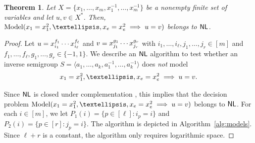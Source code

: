 \documentclass{amsart}
\newcommand{\Model}{\mathrm{Model}}
\newcommand{\eq}{\ensuremath\mathrel{=}}
\newcommand{\NL}{\ensuremath\mathsf{NL}}
\newtheorem{theorem}{Theorem}[section]
\theoremstyle{remark}
\numberwithin{equation}{section}
\begin{document}
\begin{theorem}
  Let $X = \{x_1, \dots, x_m,x_1^{-1},\dots,x_m^{-1}\}$ be a nonempty finite set of variables and let $u, v \in X^*$. Then, $\Model(x_1 \eq x_1^2,\dots,x_e \eq x_e^2 \implies u \eq v)$ belongs to $\NL$.
  \label{thm:model}
\end{theorem}
%
\begin{proof}
  Let $u \eq x_{i_1}^{f_1} \cdots x_{i_\ell}^{f_\ell}$ and $v \eq x_{j_1}^{g_1} \cdots x_{j_r}^{g_r}$ with $i_1,\dots,i_\ell,j_1,\dots,j_r \in [m]$ and $f_1,\dots,f_\ell,g_1,\dots,g_r \in \{-1,1\}$. We describe an $\NL$ algorithm to test whether an inverse semigroup $S = \langle a_1, \dots, a_k,a_1^{-1},\dots,a_k^{-1} \rangle$ does \emph{not} model
  \begin{align*}
    x_1 \eq x_1^2,\dots,x_e \eq x_e^2 \implies u \eq v.
  \end{align*}
  
  Since $\NL$ is closed under complementation \cite[Thm 8.27]{SIP:ITC}, this implies that the decision problem $\Model(x_1 \eq x_1^2,\dots,x_e \eq x_e^2 \implies u \eq v)$ belongs to $\NL$.
  For each $i \in [m]$, we let $P_1(i) = \{p \in [\ell]:i_p = i\}$ and $P_2(i) = \{p \in [r]:j_p = i\}$.
  The algorithm is depicted in Algorithm~\ref{alg:models}.
  Since $\ell + r$ is a constant, the algorithm only requires logarithmic
  space.


\end{proof}
\end{document}
